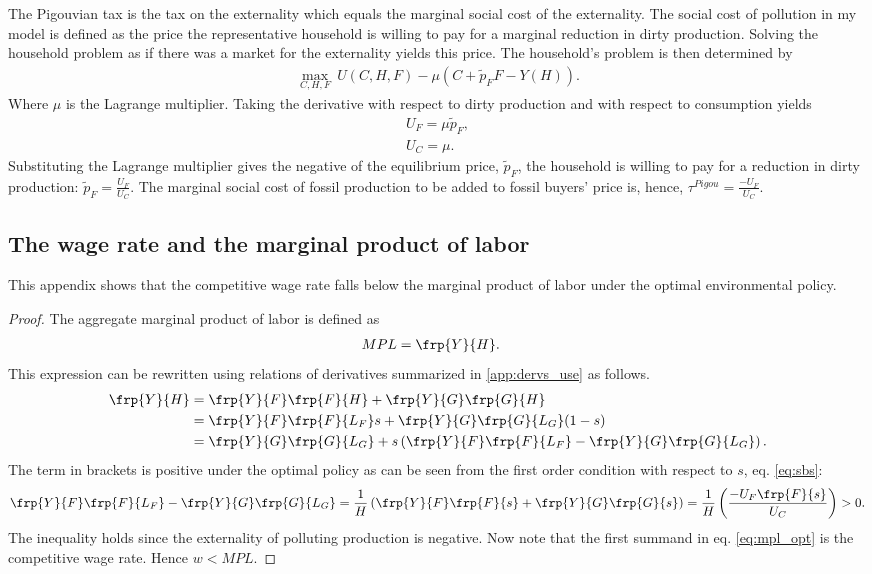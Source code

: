 The Pigouvian tax is the tax on the externality which equals the marginal social cost of the externality. 
The social cost of pollution in my model is defined as the price the representative household is willing to pay for a marginal reduction in dirty production. Solving the household problem as if there was a market for the externality yields this price. 
The household's problem is then determined by
\begin{align*}
\underset{C,H,F}{\max}\ U(C,H,F)-\mu \left(C+\tilde{p}_FF-Y(H)\right).
\end{align*}
Where $\mu$ is the Lagrange multiplier. Taking the derivative with respect to dirty production  and with respect to consumption yields
\begin{align*}
U_F=\mu \tilde{p}_F,\\
U_C=\mu.
\end{align*}
Substituting the Lagrange multiplier gives the negative of the equilibrium price, $\tilde{p}_F$, the household is willing to pay for a reduction in dirty production: $\tilde{p}_F=\frac{U_F}{U_C}$. The marginal social cost of fossil production to be added to fossil buyers' price is, hence, $\tau^{Pigou}=\frac{-U_F}{U_C}$.


\subsection{The wage rate and the marginal product of labor}\label{app:wageMPL}
This appendix shows that the competitive wage rate falls below the marginal product of labor under the optimal environmental policy. 
\begin{proof}
The aggregate marginal product of labor is defined as
\begin{align}
MPL&= \frp{Y}{H}.\nonumber
\end{align}
This expression can be rewritten using relations of derivatives summarized in \ref{app:dervs_use} as follows.
\begin{align}
 \frp{Y}{H}&= \frp{Y}{F}\frp{F}{H}+\frp{Y}{G}\frp{G}{H}\nonumber\\
&= \frp{Y}{F}\frp{F}{L_F}s+\frp{Y}{G}\frp{G}{L_G}(1-s)\nonumber\\
&= \frp{Y}{G}\frp{G}{L_G}+ s\left(\frp{Y}{F}\frp{F}{L_F}-\frp{Y}{G}\frp{G}{L_G}\right).\label{eq:mpl_opt}
\end{align}
The term in brackets is positive under the optimal policy as can be seen from the first order condition with respect to $s$, eq. \eqref{eq:sbs}:
\begin{align}
\frp{Y}{F}\frp{F}{L_F}-\frp{Y}{G}\frp{G}{L_G}=\frac{1}{H}\left(\frp{Y}{F}\frp{F}{s}+\frp{Y}{G}\frp{G}{s}\right)=\frac{1}{H}\left(\frac{-U_F\frp{F}{s}}{U_C}\right)>0.\label{eq:gap}
\end{align}
The inequality holds since the externality of polluting production is negative. %
Now note that the first summand in eq. \eqref{eq:mpl_opt} is the competitive wage rate.  Hence $w<MPL$.

\end{proof}
